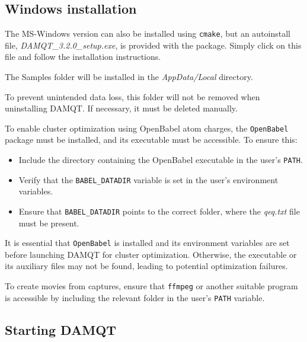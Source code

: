 \documentclass[10pt]{article}
\begin{document}
\subsection{Windows installation \label{sec:1.2}}

The MS-Windows version can also be installed using \texttt{cmake}, but an autoinstall file,
{\it DAMQT\_3.2.0\_setup.exe}, is provided with the package. Simply click on this file and follow the installation instructions.

The Samples folder will be installed in the {\it AppData/Local} directory.

To prevent unintended data loss, this folder will not be removed when uninstalling DAMQT.
If necessary, it must be deleted manually.

To enable cluster optimization using OpenBabel atom charges, the \texttt{OpenBabel} package must be installed,
and its executable must be accessible. To ensure this:

\begin{itemize}
\item Include the directory containing the OpenBabel executable in the user's \texttt{PATH}.
\item Verify that the \texttt{BABEL\_DATADIR} variable is set in the user's environment variables.
\item Ensure that \texttt{BABEL\_DATADIR} points to the correct folder, where the {\it qeq.txt} file must be present.
\end{itemize}

It is essential that \texttt{OpenBabel} is installed and its environment variables are set
before launching DAMQT for cluster optimization. Otherwise, the executable or its auxiliary files may not be found,
leading to potential optimization failures.

To create movies from captures, ensure that \texttt{ffmpeg} or another suitable program is accessible
by including the relevant folder in the user's \texttt{PATH} variable.

\subsection{Starting DAMQT \label{sec:1.3}}
\end{document}

